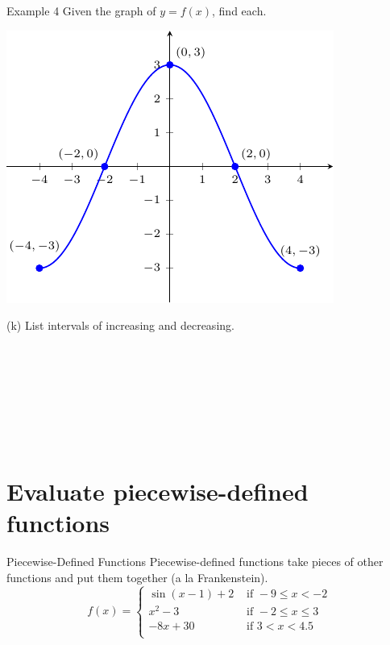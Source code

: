 \documentclass[t,usenames,dvipsnames]{beamer}
\begin{document}
\begin{frame}{Example 4}
Given the graph of $y=f(x)$, find each. \newline\\
\begin{minipage}{0.6\textwidth}
\includegraphics{example4.pdf}
\end{minipage}
\hspace{0.5cm}
\begin{minipage}{0.33\textwidth}
(k) List intervals of increasing and decreasing.  \\\\
 \\\\
 \\\\
 \\\\
\end{minipage}
\end{frame}


\section{Evaluate piecewise-defined functions}


\begin{frame}{Piecewise-Defined Functions}
Piecewise-defined functions take pieces of other functions and put them together (a la Frankenstein).  
\[
f(x) = \begin{cases}
\sin(x-1) + 2 &\text{ if } -9\leq x < -2 \\
x^2 - 3 &\text{ if } -2 \leq x \leq 3 \\
-8x+30 &\text{ if } 3 < x < 4.5\\
\end{cases}
\]
\end{frame}
\end{document}
